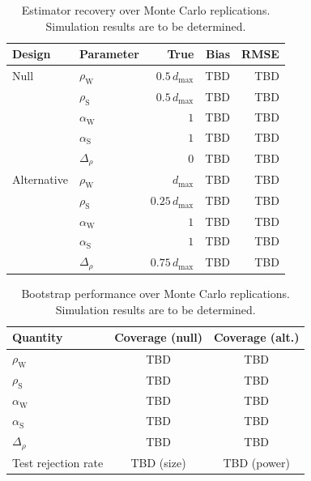 \begin{table}[t]
  \centering
  \caption{Estimator recovery over Monte Carlo replications. Simulation results are to be determined.}
  \label{tab:res-recovery}
  \begin{tabular}{llrrr}
    \hline
    Design      & Parameter              & True               & Bias & RMSE \\
    \hline
    Null        & \(\rho_{\mathrm W}\)   & \(0.5\,d_{\max}\)  & TBD  & TBD  \\
                & \(\rho_{\mathrm S}\)   & \(0.5\,d_{\max}\)  & TBD  & TBD  \\
                & \(\alpha_{\mathrm W}\) & \(1\)              & TBD  & TBD  \\
                & \(\alpha_{\mathrm S}\) & \(1\)              & TBD  & TBD  \\
                & \(\Delta_\rho\)        & \(0\)              & TBD  & TBD  \\
    \hline
    Alternative & \(\rho_{\mathrm W}\)   & \(d_{\max}\)       & TBD  & TBD  \\
                & \(\rho_{\mathrm S}\)   & \(0.25\,d_{\max}\) & TBD  & TBD  \\
                & \(\alpha_{\mathrm W}\) & \(1\)              & TBD  & TBD  \\
                & \(\alpha_{\mathrm S}\) & \(1\)              & TBD  & TBD  \\
                & \(\Delta_\rho\)        & \(0.75\,d_{\max}\) & TBD  & TBD  \\
    \hline
  \end{tabular}
\end{table}

\begin{table}[t]
  \centering
  \caption{Bootstrap performance over Monte Carlo replications. Simulation results are to be determined.}
  \label{tab:res-inference}
  \begin{tabular}{lcc}
    \hline
    Quantity               & Coverage (null) & Coverage (alt.) \\
    \hline
    \(\rho_{\mathrm W}\)   & TBD             & TBD             \\
    \(\rho_{\mathrm S}\)   & TBD             & TBD             \\
    \(\alpha_{\mathrm W}\) & TBD             & TBD             \\
    \(\alpha_{\mathrm S}\) & TBD             & TBD             \\
    \(\Delta_\rho\)        & TBD             & TBD             \\
    \hline
    Test rejection rate    & TBD (size)      & TBD (power)     \\
    \hline
  \end{tabular}
\end{table}

